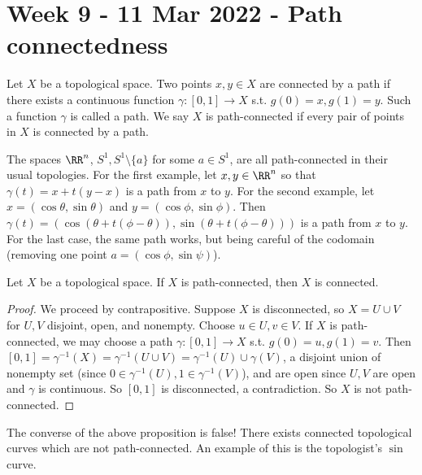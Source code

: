 \section{Week 9 - 11 Mar 2022 - Path connectedness }
\begin{definition}
  Let $X$ be a topological space. Two points $x,y\in X$ are connected by a path
  if there exists a continuous function $\gamma:[0,1]\to X$ s.t. $g(0)=x,
  g(1)=y$. Such a function $\gamma$ is called a path. We say $X$ is
  path-connected if every pair of points in $X$ is connected by a path.
  \label{def:pathConnect}
\end{definition}
\begin{example}
  The spaces $\RR^n$, $S^1, S^1\setminus\{a\}$ for some $a\in S^1$, are all
  path-connected in their usual topologies. For the first example, let
  $x,y\in\RR^n$ so that $\gamma(t)=x+t(y-x)$ is a path from $x$ to $y$. For the
  second example, let $x=(\cos\theta, \sin\theta)$ and $y=(\cos\phi, \sin\phi)$.
  Then $\gamma(t)=(\cos(\theta+t(\phi-\theta)), \sin(\theta+t(\phi-\theta)))$ is
  a path from $x$ to $y$. For the last case, the same path works, but being
  careful of the codomain (removing one point $a=(\cos\phi, \sin\psi)$).
\end{example}

\begin{proposition}
  Let $X$ be a topological space. If $X$ is path-connected, then $X$ is
  connected.
  \label{prop:pathConnectConnect}
\end{proposition}
\begin{proof}
  We proceed by contrapositive. Suppose $X$ is disconnected, so $X=U\cup V$ for
  $U,V$ disjoint, open, and nonempty. Choose $u\in U, v\in V$. If $X$ is
  path-connected, we may choose a path $\gamma:[0,1]\to X$ s.t. $g(0)=u,
  g(1)=v$. Then $[0,1]=\gamma^{-1}(X)=\gamma^{-1}(U\cup V)=\gamma^{-1}(U)\cup
  \gamma(V)$, a disjoint union of nonempty set (since $0\in \gamma^{-1}(U),
  1\in\gamma^{-1}(V)$), and are open since $U, V$ are open and $\gamma$ is
  continuous. So $[0,1]$ is disconnected, a contradiction. So $X$ is not
  path-connected.
\end{proof}
\begin{remark}
  The converse of the above proposition is false! There exists connected
  topological curves which are not path-connected. An example of this is the
  topologist's $\sin$ curve.
  \label{rem:connectedNotPathConn}
\end{remark}


